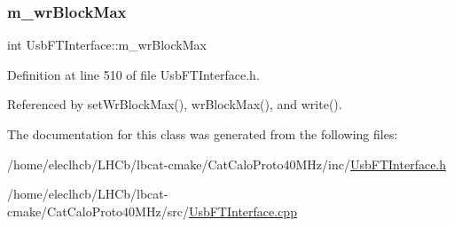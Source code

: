 \subsubsection{\texorpdfstring{m\+\_\+wr\+Block\+Max}{m\_wrBlockMax}}
{\footnotesize\ttfamily int Usb\+F\+T\+Interface\+::m\+\_\+wr\+Block\+Max\hspace{0.3cm}{\ttfamily [private]}}



Definition at line 510 of file Usb\+F\+T\+Interface.\+h.



Referenced by set\+Wr\+Block\+Max(), wr\+Block\+Max(), and write().



The documentation for this class was generated from the following files\+:\begin{DoxyCompactItemize}
\item 
/home/eleclhcb/\+L\+H\+Cb/lbcat-\/cmake/\+Cat\+Calo\+Proto40\+M\+Hz/inc/\hyperlink{UsbFTInterface_8h}{Usb\+F\+T\+Interface.\+h}\item 
/home/eleclhcb/\+L\+H\+Cb/lbcat-\/cmake/\+Cat\+Calo\+Proto40\+M\+Hz/src/\hyperlink{UsbFTInterface_8cpp}{Usb\+F\+T\+Interface.\+cpp}\end{DoxyCompactItemize}
